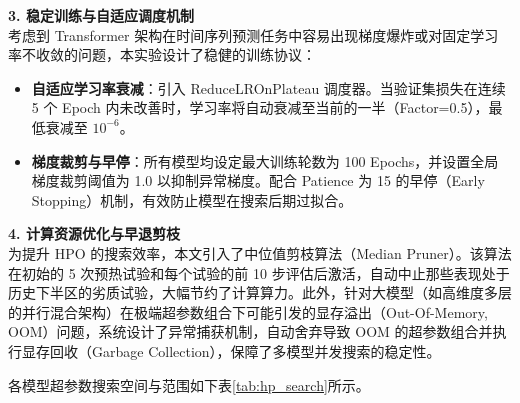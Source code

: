 \documentclass[UTF8,AutoFakeBold=1,AutoFakeSlant,zihao=-4]{SCAU}
\begin{document}
\textbf{3. 稳定训练与自适应调度机制} \\
考虑到 Transformer 架构在时间序列预测任务中容易出现梯度爆炸或对固定学习率不收敛的问题，本实验设计了稳健的训练协议：
\begin{itemize}
  \item \textbf{自适应学习率衰减}：引入 ReduceLROnPlateau 调度器。当验证集损失在连续 5 个 Epoch 内未改善时，学习率将自动衰减至当前的一半（Factor=0.5），最低衰减至 $10^{-6}$。
  \item \textbf{梯度裁剪与早停}：所有模型均设定最大训练轮数为 100 Epochs，并设置全局梯度裁剪阈值为 1.0 以抑制异常梯度。配合 Patience 为 15 的早停（Early Stopping）机制，有效防止模型在搜索后期过拟合。
\end{itemize}

\textbf{4. 计算资源优化与早退剪枝} \\
为提升 HPO 的搜索效率，本文引入了中位值剪枝算法（Median Pruner）。该算法在初始的 5 次预热试验和每个试验的前 10 步评估后激活，自动中止那些表现处于历史下半区的劣质试验，大幅节约了计算算力。此外，针对大模型（如高维度多层的并行混合架构）在极端超参数组合下可能引发的显存溢出（Out-Of-Memory, OOM）问题，系统设计了异常捕获机制，自动舍弃导致 OOM 的超参数组合并执行显存回收（Garbage Collection），保障了多模型并发搜索的稳定性。

各模型超参数搜索空间与范围如下表\ref{tab:hp_search}所示。
\end{document}
